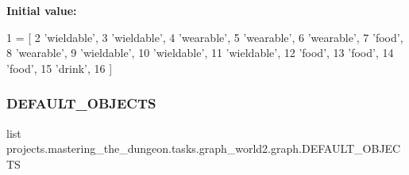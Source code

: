 {\bfseries Initial value\+:}
\begin{DoxyCode}
1 =  [
2     \textcolor{stringliteral}{'wieldable'},
3     \textcolor{stringliteral}{'wieldable'},
4     \textcolor{stringliteral}{'wearable'},
5     \textcolor{stringliteral}{'wearable'},
6     \textcolor{stringliteral}{'wearable'},
7     \textcolor{stringliteral}{'food'},
8     \textcolor{stringliteral}{'wearable'},
9     \textcolor{stringliteral}{'wieldable'},
10     \textcolor{stringliteral}{'wieldable'},
11     \textcolor{stringliteral}{'wieldable'},
12     \textcolor{stringliteral}{'food'},
13     \textcolor{stringliteral}{'food'},
14     \textcolor{stringliteral}{'food'},
15     \textcolor{stringliteral}{'drink'},
16 ]
\end{DoxyCode}
\mbox{\label{namespaceprojects_1_1mastering__the__dungeon_1_1tasks_1_1graph__world2_1_1graph_a5adca69a99c88e39290df4e46afda30f}} 
\subsubsection{\texorpdfstring{D\+E\+F\+A\+U\+L\+T\+\_\+\+O\+B\+J\+E\+C\+TS}{DEFAULT\_OBJECTS}}
{\footnotesize\ttfamily list projects.\+mastering\+\_\+the\+\_\+dungeon.\+tasks.\+graph\+\_\+world2.\+graph.\+D\+E\+F\+A\+U\+L\+T\+\_\+\+O\+B\+J\+E\+C\+TS}

